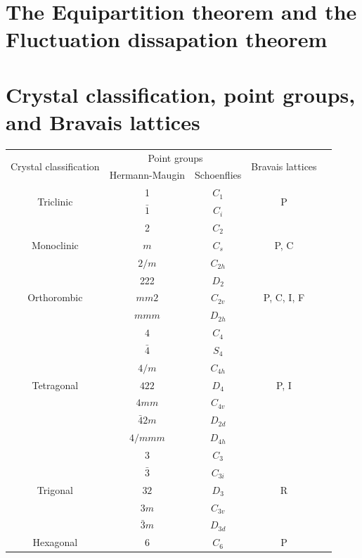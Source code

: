 
\section{The Equipartition theorem and the Fluctuation dissapation theorem}

\newpage
\section{Crystal classification, point groups, and Bravais lattices}

\begin{center}
\begin{tabular}{|c|c|c|c|c|}
\hline
\multirow{2}{10em}{Crystal classification} & \multicolumn{2}{|c|}{Point groups} & \multirow{2}{8em}{Bravais lattices} \\ \cline{2-3}
& Hermann-Maugin & Schoenflies & \\
\hline
\multirow{2}{10em}{Triclinic} & 1 & $C_1$ & \multirow{2}{8em}{P} \\
& $\bar{1}$ & $C_i$ &  \\ \hline
\multirow{3}{10em}{Monoclinic} & 2 & $C_2$ & \multirow{3}{8em}{P, C} \\
& $m$ & $C_s$ & \\
& $2/m$ & $C_{2h}$ & \\ \hline
\multirow{3}{10em}{Orthorombic} & 222 & $D_2$ & \multirow{3}{8em}{P, C, I, F} \\
& $mm2$ & $C_{2v}$ & \\
& $mmm$ & $D_{2h}$ & \\ \hline
\multirow{7}{10em}{Tetragonal} & $4$ & $C_4$ & \multirow{7}{8em}{P, I} \\
& $\bar{4}$ & $S_4$ &  \\
& $4/m$ & $C_{4h}$ &  \\
& $422$ & $D_4$ &  \\
& $4mm$ & $C_{4v}$ &  \\
& $\bar{4}2m$ & $D_{2d}$ &  \\
& $4/mmm$ & $D_{4h}$ &  \\ \hline
\multirow{5}{10em}{Trigonal} & $3$ & $C_3$ & \multirow{5}{8em}{R} \\
& $\bar{3}$ & $C_{3i}$ &  \\
& $32$ & $D_3$ &  \\
& $3m$ & $C_{3v}$ &  \\
& $\bar{3}m$ & $D_{3d}$ &  \\ \hline
\multirow{7}{10em}{Hexagonal} & $6$ & $C_6$ & \multirow{5}{8em}{P} \\

\end{tabular}
\end{center}
